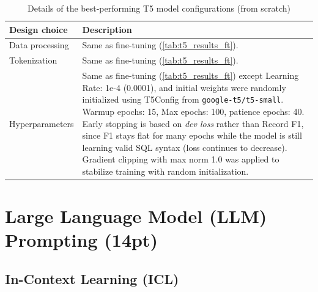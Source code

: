 \documentclass{article}
\begin{document}
\begin{table}[h!]
\centering
\begin{tabular}{p{3.5cm}p{10cm}}
\toprule
Design choice & Description \\
\midrule
Data processing & Same as fine-tuning (\autoref{tab:t5_results_ft}). \\
Tokenization & Same as fine-tuning (\autoref{tab:t5_results_ft}). \\
Hyperparameters & Same as fine-tuning (\autoref{tab:t5_results_ft}) except Learning Rate: 1e-4 (0.0001), and initial weights were randomly initialized using T5Config from \texttt{google-t5/t5-small}. Warmup epochs: 15, Max epochs: 100, patience epochs: 40. Early stopping is based on \emph{dev loss} rather than Record F1, since F1 stays flat for many epochs while the model is still learning valid SQL syntax (loss continues to decrease). Gradient clipping with max norm 1.0 was applied to stabilize training with random initialization. \\
\bottomrule
\end{tabular}
\caption{Details of the best-performing T5 model configurations (from scratch)}
\label{tab:t5_results_scratch}
\end{table}


\newpage



\section{Large Language Model (LLM) Prompting (14pt)}\label{sec:llm}

\subsection{In-Context Learning (ICL)}\label{sec:llm:icl}
\end{document}

